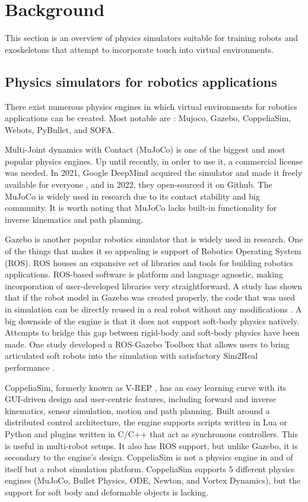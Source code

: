 \section{Background}
This section is an overview of physics simulators suitable for training robots and exoskeletons that attempt to incorporate touch into virtual environments.

\subsection{Physics simulators for robotics applications}
There exist numerous physics engines in which virtual environments for robotics applications can be created. Most notable are \cite{physics_simulators_review}: Mujoco, Gazebo, CoppeliaSim, Webots, PyBullet, and SOFA.

\bigskip \noindent
Multi-Joint dynamics with Contact (MuJoCo) \cite{mujoco} is one of the biggest and most popular physics engines. Up until recently, in order to use it, a commercial license was needed. In 2021, Google DeepMind acquired the simulator and made it freely available for everyone \cite{deepmind2021mujoco}, and in 2022, they open-sourced it on Github. The MuJoCo is widely used in research due to its contact stability \cite{app13020680} and big community. It is worth noting that MuJoCo lacks built-in functionality for inverse kinematics and path planning.

\bigskip \noindent
Gazebo is another popular robotics simulator that is widely used in research. One of the things that makes it so appealing is support of Robotics Operating System \cite{ros} (ROS). ROS houses an expansive set of libraries and tools for building robotics applications. ROS-based software is platform and language agnostic, making incorporation of user-developed libraries very straightforward. A study has shown that if the robot model in Gazebo was created properly, the code that was used in simulation can be directly reused in a real robot without any modifications \cite{ros-gazebo-integration}. A big downside of the engine is that it does not support soft-body physics natively. Attempts to bridge this gap between rigid-body and soft-body physics have been made. One study developed a ROS-Gazebo Toolbox that allows users to bring articulated soft robots into the simulation with satisfactory Sim2Real performance \cite{Mengacci2021}.

\bigskip \noindent
CoppeliaSim, formerly known as V-REP \cite{coppelia}, has an easy learning curve with its GUI-driven design and user-centric features, including forward and inverse kinematics, sensor simulation, motion and path planning. Built around a distributed control architecture, the engine supports scripts written in Lua or Python and plugins written in C/C++ that act as synchronous controllers. This is useful in multi-robot setups. It also has ROS support, but unlike Gazebo, it is secondary to the engine's design. CoppeliaSim is not a physics engine in and of itself but a robot simulation platform. CoppeliaSim supports 5 different physics engines (MuJoCo, Bullet Physics, ODE, Newton, and Vortex Dynamics), but the support for soft body and deformable objects is lacking.

